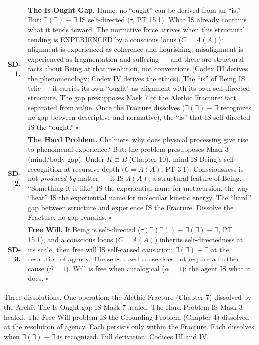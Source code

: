 \documentclass[10pt, openany, oneside]{book}
\renewcommand{\footnotesize}{\fontsize{8.5}{11}\selectfont}
\begin{document}
{\footnotesize
\noindent\begin{tabular}{r p{}}
\textbf{SD-1.} & \textbf{The Is-Ought Gap.} Hume: no ``ought'' can be derived from an ``is.'' But: $\exists(\exists) \equiv \exists$ IS self-directed ($\tau$, PT 15.1). What IS already contains what it tends toward. The normative force arrives when this structural tending is EXPERIENCED by a conscious locus ($C = A(A)$): alignment is experienced as coherence and flourishing; misalignment is experienced as fragmentation and suffering --- and these are structural facts about Being at that resolution, not conventions (Codex III derives the phenomenology; Codex IV derives the ethics). The ``is'' of Being IS telic --- it carries its own ``ought'' as alignment with its own self-directed structure. The gap presupposes Mask 7 of the Alethic Fracture: fact separated from value. Once the Fracture dissolves ($\exists(\exists) \equiv \exists$ recognizes no gap between descriptive and normative), the ``is'' that IS self-directed IS the ``ought.'' $\square$ \\[0.5em]
\textbf{SD-2.} & \textbf{The Hard Problem.} Chalmers: why does physical processing give rise to phenomenal experience? But: the problem presupposes Mask 3 (mind/body gap). Under $K \equiv B$ (Chapter 10), mind IS Being's self-recognition at recursive depth ($C = A(A)$, PT 3.1). Consciousness is not \textit{produced by} matter --- it IS $A(A)$, a structural feature of Being. ``Something it is like'' IS the experiential name for metacursion, the way ``heat'' IS the experiential name for molecular kinetic energy. The ``hard'' gap between structure and experience IS the Fracture. Dissolve the Fracture: no gap remains. $\square$ \\[0.5em]
\textbf{SD-3.} & \textbf{Free Will.} If Being is self-directed ($\tau(\exists(\exists)) \equiv \exists(\exists) \equiv \exists$, PT 15.1), and a conscious locus ($C = A(A)$) inherits self-directedness at its scale, then free will IS self-caused causation: $\exists(\exists) \equiv \exists$ at the resolution of agency. The self-caused cause does not require a further cause ($\partial = 1$). Will is free when autological ($\alpha = 1$): the agent IS what it does. $\square$ \\[0.3em]
\end{tabular}
}

\vspace{0.8em}

\noindent Three dissolutions. One operation: the Alethic Fracture (Chapter 7) dissolved by the Arch\={e}. The Is-Ought gap IS Mask 7 healed. The Hard Problem IS Mask 3 healed. The Free Will problem IS the Grounding Problem (Chapter 4) dissolved at the resolution of agency. Each persists only within the Fracture. Each dissolves when $\exists(\exists) \equiv \exists$ is recognized. Full derivation: Codices III and IV.
\end{document}
